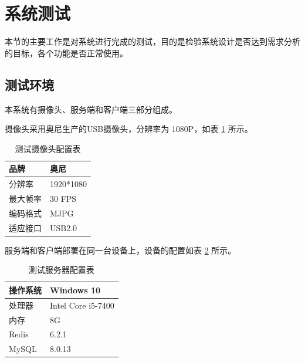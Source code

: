\newpage
\section{系统测试}
本节的主要工作是对系统进行完成的测试，目的是检验系统设计是否达到需求分析的目标，各个功能是否正常使用。




\subsection{测试环境}
本系统有摄像头、服务端和客户端三部分组成。

摄像头采用奥尼生产的USB摄像头，分辨率为 1080P，如表 \ref{Tab:cam} 所示。
\begin{longtable}[ht]{|l|l|}
    \caption{测试摄像头配置表}
    \label{Tab:cam}\\
    \hline
    品牌&奥尼\\
    \hline
    分辨率&1920*1080\\
    \hline
    最大帧率&30 FPS\\
    \hline
    编码格式&MJPG \\
    \hline
    适应接口&USB2.0\\
    \hline
    \end{longtable}

服务端和客户端部署在同一台设备上，设备的配置如表 \ref{Tab:conf} 所示。

\begin{longtable}[ht]{|l|l|}
\caption{测试服务器配置表}
\label{Tab:conf}\\
\hline
操作系统&Windows 10\\
\hline
处理器&Intel Core i5-7400\\
\hline
内存&8G\\
\hline
Redis&6.2.1 \\
\hline
MySQL&8.0.13\\
\hline
\end{longtable}

\newpage
